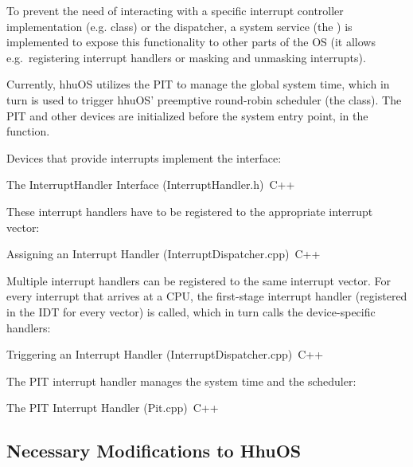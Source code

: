 To prevent the need of interacting with a specific interrupt controller implementation (e.g.  class) or the dispatcher, a system service (the ) is implemented to expose this functionality to other parts of the OS (it allows e.g.\ registering interrupt handlers or masking and unmasking interrupts).

Currently, hhuOS utilizes the PIT to manage the global system time, which in turn is used to trigger hhuOS' preemptive round-robin scheduler (the  class).
The PIT and other devices are initialized before the system entry point, in the  function.

Devices that provide interrupts implement the  interface:

\begin{codeblock}{The InterruptHandler Interface (InterruptHandler.h)~\autocite{hhuos}}{C++}
\end{codeblock}

These interrupt handlers have to be registered to the appropriate interrupt vector:

\begin{codeblock}{Assigning an Interrupt Handler (InterruptDispatcher.cpp)~\autocite{hhuos}}{C++}
\end{codeblock}

Multiple interrupt handlers can be registered to the same interrupt vector.
For every interrupt that arrives at a CPU, the first-stage interrupt handler (registered in the IDT for every vector) is called, which in turn calls the device-specific handlers:

\begin{codeblock}{Triggering an Interrupt Handler (InterruptDispatcher.cpp)~\autocite{hhuos}}{C++}
\end{codeblock}

The PIT interrupt handler manages the system time and the scheduler:

\begin{codeblock}{The PIT Interrupt Handler (Pit.cpp)~\autocite{hhuos}}{C++}
\end{codeblock}

\subsection{Necessary Modifications to HhuOS}
\label{subsec:hhuosintegration}

